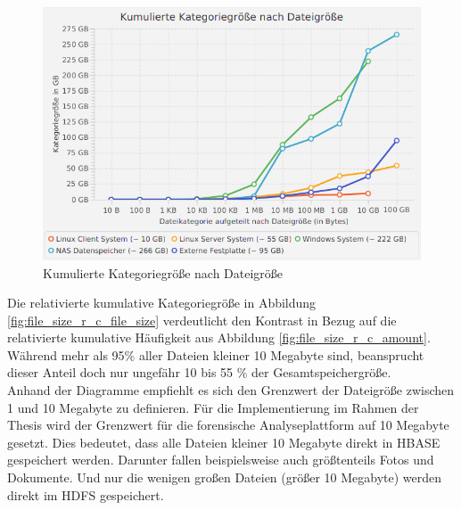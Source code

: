  \begin{figure}[ht]
  \centering
  \includegraphics[width=\textwidth]{./resource/fileSize_cumulatedCategorieSize.png}
  \caption{Kumulierte Kategoriegröße nach Dateigröße}
  \label{fig:file_size_c_file_size}
\end{figure}

\noindent
Die relativierte kumulative Kategoriegröße in Abbildung \ref{fig:file_size_r_c_file_size} verdeutlicht den Kontrast in Bezug auf die relativierte kumulative Häufigkeit aus Abbildung \ref{fig:file_size_r_c_amount}. Während mehr als 95\% aller Dateien kleiner 10 Megabyte sind, beansprucht dieser Anteil doch nur ungefähr 10 bis 55 \% der Gesamtspeichergröße.\\

\noindent
Anhand der Diagramme empfiehlt es sich den Grenzwert der Dateigröße zwischen 1 und 10 Megabyte zu definieren. Für die Implementierung im Rahmen der Thesis wird der Grenzwert für die forensische Analyseplattform auf 10 Megabyte gesetzt. Dies bedeutet, dass alle Dateien kleiner 10 Megabyte direkt in HBASE gespeichert werden. Darunter fallen beispielsweise auch größtenteils Fotos und Dokumente. Und nur die wenigen großen Dateien (größer 10 Megabyte) werden direkt im HDFS gespeichert.  


